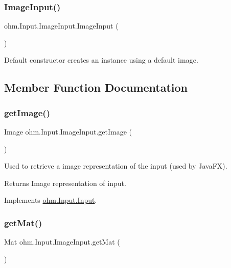 \subsubsection{\texorpdfstring{Image\+Input()}{ImageInput()}}
{\footnotesize\ttfamily ohm.\+Input.\+Image\+Input.\+Image\+Input (\begin{DoxyParamCaption}{ }\end{DoxyParamCaption})}

Default constructor creates an instance using a default image. 

\subsection{Member Function Documentation}
\hypertarget{classohm_1_1_input_1_1_image_input_a589cf238e644e9bd38a1473fedf2399c}{}\label{classohm_1_1_input_1_1_image_input_a589cf238e644e9bd38a1473fedf2399c} 
\subsubsection{\texorpdfstring{get\+Image()}{getImage()}}
{\footnotesize\ttfamily Image ohm.\+Input.\+Image\+Input.\+get\+Image (\begin{DoxyParamCaption}{ }\end{DoxyParamCaption})}

Used to retrieve a image representation of the input (used by Java\+FX). \begin{DoxyReturn}{Returns}
Image representation of input. 
\end{DoxyReturn}


Implements \hyperlink{interfaceohm_1_1_input_1_1_input_aa58ab6e0dd8e835ac9b819402d150d17}{ohm.\+Input.\+Input}.

\hypertarget{classohm_1_1_input_1_1_image_input_a25141276b489aa062e7c855cb35c3b14}{}\label{classohm_1_1_input_1_1_image_input_a25141276b489aa062e7c855cb35c3b14} 
\subsubsection{\texorpdfstring{get\+Mat()}{getMat()}}
{\footnotesize\ttfamily Mat ohm.\+Input.\+Image\+Input.\+get\+Mat (\begin{DoxyParamCaption}{ }\end{DoxyParamCaption})}

